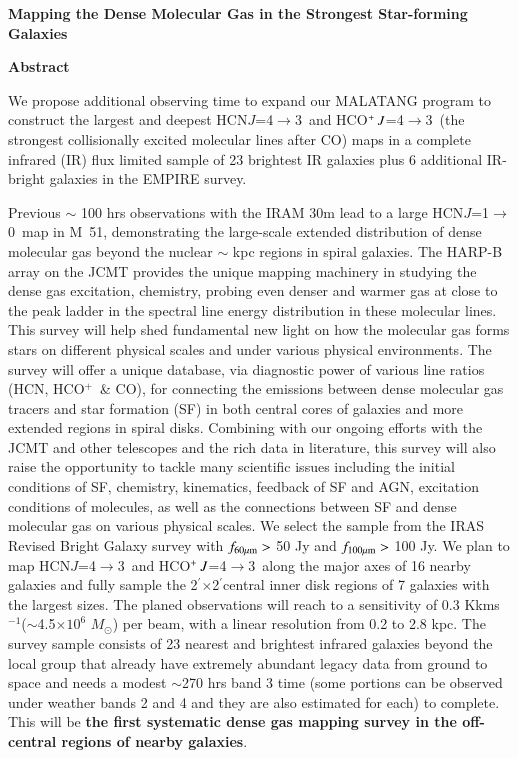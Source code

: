 \documentclass[legal,11pt]{article}
\def\kms    {\ifmmode{{\rm \ts km\ts s}^{-1}}\else{\ts km\ts s$^{-1}$}\fi}
\def\kms    {km\,s$^{-1}$\,}
\def\arcmin {\hbox{$^{\prime}$}}
\def\Kkms{K\,\kms }
\def\,{\thinspace}
\def\Msun{$M_\odot$}
\def\HCOP       {HCO$^{+}$}
\def\HCNoz      {HCN\,$J$=1$\rightarrow$0}
\def\HCNft        {HCN\,$J$=4$\rightarrow$3}
\def\HCOPft     {HCO$^+\,J$=4$\rightarrow$3}
\begin{document}
\begin{center}
        {\large\bf Mapping the Dense Molecular Gas in the Strongest Star-forming Galaxies}


\vspace { 0.5 cm}
 {\Large\bf Abstract} 
\justify
{{
We propose additional observing time to expand our MALATANG program to construct 
the largest and deepest \HCNft\ and \HCOPft\ (the strongest collisionally excited 
molecular lines after CO) maps in a complete infrared (IR) flux limited sample of 23
brightest IR galaxies plus 6 additional IR-bright galaxies in the EMPIRE survey. 

Previous $\sim$ 100 hrs observations with the IRAM 30m lead to a large \HCNoz\ map 
in M~51, demonstrating the large-scale extended distribution of dense molecular 
gas beyond the nuclear $\sim$ kpc regions in spiral galaxies. The HARP-B array on 
the JCMT provides the unique mapping machinery in studying the dense gas excitation, 
chemistry, probing even denser and warmer gas at close to the peak ladder in the 
spectral line energy distribution in these molecular lines.  This survey will help 
shed fundamental new light on how the molecular gas forms stars on different 
physical scales and under various physical environments.  The survey will offer a unique
database, via diagnostic power of various line ratios (HCN, \HCOP\ \& CO),  for 
connecting the emissions between dense molecular gas tracers and star formation (SF) 
in both central cores of galaxies and more extended regions in spiral disks. 
Combining with our ongoing efforts with the JCMT and other telescopes and the 
rich data in literature, this survey will also raise the opportunity to tackle 
many scientific issues including the initial conditions of SF, chemistry, kinematics,
feedback of SF and AGN, excitation conditions of molecules, as well as the connections 
between SF and dense molecular gas on various physical scales. We select the sample 
from the IRAS Revised Bright Galaxy survey
        with $f_{\rm 60\mu m}>$ 50 Jy and $f_{\rm 100\mu m}>$ 100 Jy.  We plan
        to map \HCNft\ and \HCOPft\ along the major axes of 16 nearby galaxies
        and fully sample the 2\arcmin$\times$2\arcmin central inner disk
        regions of 7 galaxies with the largest sizes. The planed observations
        will reach to a sensitivity of 0.3 \Kkms ($\sim$4.5$\times10^6$ \Msun)
        per beam, with a linear resolution from 0.2 to 2.8 kpc.  The survey
        sample consists of 23 nearest and brightest infrared galaxies beyond
        the local group that already have  extremely abundant legacy data from
        ground to space and needs a modest $\sim$270 hrs band 3 time (some
        portions can be observed under weather bands 2 and 4 and they are also
        estimated for each) to complete.  This will be {\bf the first
        systematic dense gas mapping survey in the off-central regions of
nearby galaxies}. }}

\end{center}
\end{document}
